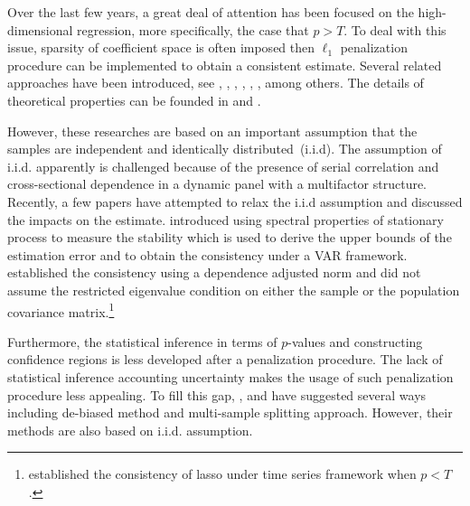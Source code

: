 \documentclass[11pt,a4paper]{article}
\theoremstyle{definition}
\begin{document}
Over the last few years, a great deal of attention has been focused on the high-dimensional regression, more specifically, the case that $p>T$. To deal with this issue, sparsity of coefficient space is often imposed then $\ell_1$ penalization procedure can be implemented to obtain a consistent estimate. Several related approaches have been introduced, see \citet{Efron2004}, \citet{Zhao2006}, \citet{Candes2007}, \citet{Zou2006}, \citet{Yuan2006}, \citet{Fan2001}, among others. The details of theoretical properties can be founded in \citet{Bickel2009} and \citet{buhlmann2011statistics}.

However, these researches are based on an important assumption that the samples are independent and identically distributed~(i.i.d). The assumption of i.i.d. apparently is challenged because of the presence of serial correlation and cross-sectional dependence in a dynamic panel with a multifactor structure.  Recently, a few papers have attempted to relax the i.i.d assumption and discussed the impacts on the estimate. \citet{Basu2015} introduced using spectral properties of stationary process to measure the stability which is used to derive the upper bounds of the estimation error and to obtain the consistency under a VAR framework. \citet{Han2020} established the consistency using a dependence adjusted norm and did not assume the restricted eigenvalue condition on either the sample or the population covariance matrix.\footnote{\citet{Wang2007} established the consistency of lasso under time series framework when $p<T$.}

Furthermore, the statistical inference in terms of $p$-values and constructing confidence regions is less developed after a penalization procedure. The lack of statistical inference accounting uncertainty makes the usage of such penalization procedure less appealing. To fill this gap, \citet{Zhang2014}, \citet{VanDeGeer2014} and \citet{Javanmard2014} have suggested several ways including de-biased method and multi-sample splitting approach. However, their methods are also based on i.i.d. assumption.
\end{document}
